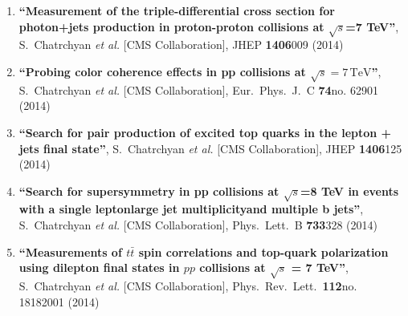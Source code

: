 \begin{enumerate}
\item%
{\bf ``Measurement of the triple-differential cross section for photon+jets production in proton-proton collisions at $\sqrt{s}$=7 TeV''}, 
  S.~Chatrchyan {\it et al.}  [CMS Collaboration], 
JHEP {\bf 1406}009 (2014) %


\item%
{\bf ``Probing color coherence effects in pp collisions at $\sqrt{s}=7\,\text {TeV} $''}, 
  S.~Chatrchyan {\it et al.}  [CMS Collaboration], 
Eur.\ Phys.\ J.\ C {\bf 74}no. 62901 (2014) %


\item%
{\bf ``Search for pair production of excited top quarks in the lepton + jets final state''}, 
  S.~Chatrchyan {\it et al.}  [CMS Collaboration], 
JHEP {\bf 1406}125 (2014) %


\item%
{\bf ``Search for supersymmetry in pp collisions at $\sqrt{s}$=8 TeV in events with a single leptonlarge jet multiplicityand multiple b jets''}, 
  S.~Chatrchyan {\it et al.}  [CMS Collaboration], 
Phys.\ Lett.\ B {\bf 733}328 (2014) %


\item%
{\bf ``Measurements of $t\bar{t}$ spin correlations and top-quark polarization using dilepton final states in $pp$ collisions at $\sqrt{s}$ = 7 TeV''}, 
  S.~Chatrchyan {\it et al.}  [CMS Collaboration], 
Phys.\ Rev.\ Lett.\  {\bf 112}no. 18182001 (2014) %



\end{enumerate}
